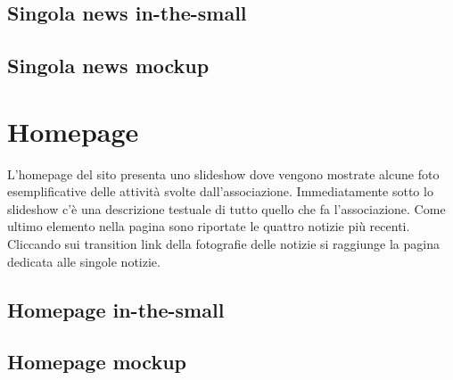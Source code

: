         \subsection{Singola news in-the-small}

        \subsection{Singola news mockup}

    \section{Homepage}
    L'homepage del sito presenta uno slideshow dove vengono mostrate alcune foto
    esemplificative delle attività svolte dall'associazione. Immediatamente
    sotto lo slideshow c'è una descrizione testuale di tutto quello che fa
    l'associazione. Come ultimo elemento nella pagina sono riportate le quattro
    notizie più recenti. Cliccando sui transition link della fotografie delle
    notizie si raggiunge la pagina dedicata alle singole notizie.
        
        \subsection{Homepage in-the-small}

        \subsection{Homepage mockup}


    